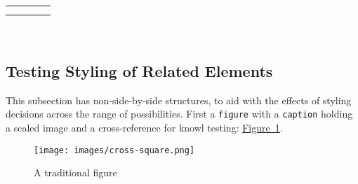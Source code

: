 \documentclass[10pt,]{article}
\theoremstyle{plain}
\theoremstyle{definition}
\theoremstyle{definition}
\theoremstyle{definition}
\theoremstyle{definition}
\theoremstyle{definition}
\theoremstyle{definition}
\numberwithin{equation}{section}
\newlength{\panelmax}
\begin{document}
{\ifdefined\phDimage\else\newlength{\phDimage}\fi%
\setlength{\phDimage}{\ht\panelboxDimage+\dp\panelboxDimage}
\settototalheight{\phDimage}{\usebox{\panelboxDimage}}
\setlength{\panelmax}{\maxof{\panelmax}{\phDimage}}
\leavevmode%
\setlength{\tabcolsep}{0.025\linewidth}
\par\medskip\noindent
\hspace*{0.025\linewidth}%
\begin{tabular}{@{}*{4}{c}@{}}
\begin{minipage}[c][\panelmax][t]{0.2\linewidth}\usebox{\panelboxAimage}\end{minipage}&
\begin{minipage}[c][\panelmax][t]{0.2\linewidth}\usebox{\panelboxBimage}\end{minipage}&
\begin{minipage}[c][\panelmax][t]{0.2\linewidth}\usebox{\panelboxCimage}\end{minipage}&
\begin{minipage}[c][\panelmax][t]{0.2\linewidth}\usebox{\panelboxDimage}\end{minipage}\tabularnewline
\parbox[t]{0.2\linewidth}{
}&
\parbox[t]{0.2\linewidth}{
}&
\parbox[t]{0.2\linewidth}{
}&
\parbox[t]{0.2\linewidth}{
}\end{tabular}\\
}%
\typeout{************************************************}
\typeout{************************************************}
\subsection[{Testing Styling of Related Elements}]{Testing Styling of Related Elements}\label{subsection-51}
\hypertarget{p-735}{}%
This subsection has non-side-by-side structures, to aid with the effects of styling decisions across the range of possibilities.  First a \lstinline?figure? with a \lstinline?caption? holding a scaled image and a cross-reference for knowl testing: \hyperref[figure-traditional]{Figure~\ref{figure-traditional}}.%
\begin{figure}
\centering
\texttt{[image: images/cross-square.png]}
\caption{A traditional figure\label{figure-traditional}}
\end{figure}
\typeout{************************************************}
\typeout{************************************************}
\end{document}
